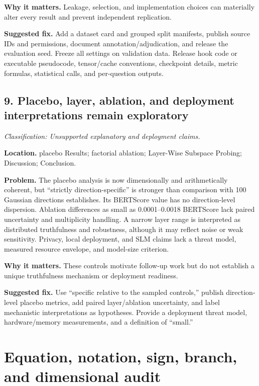 \documentclass[11pt]{article}
\newcommand{\findinglabel}[1]{\textbf{#1}}
\newcommand{\classification}[1]{\textit{Classification: #1.}}
\begin{document}
\findinglabel{Why it matters.} Leakage, selection, and implementation choices can materially alter every result and prevent independent replication.

\findinglabel{Suggested fix.} Add a dataset card and grouped split manifests, publish source IDs and permissions, document annotation/adjudication, and release the evaluation seed.  Freeze all settings on validation data.  Release hook code or executable pseudocode, tensor/cache conventions, checkpoint details, metric formulas, statistical calls, and per-question outputs.

\subsection*{9. Placebo, layer, ablation, and deployment interpretations remain exploratory}

\classification{Unsupported explanatory and deployment claims}

\findinglabel{Location.} placebo Results; factorial ablation; Layer-Wise Subspace Probing; Discussion; Conclusion.

\findinglabel{Problem.} The placebo analysis is now dimensionally and arithmetically coherent, but ``strictly direction-specific'' is stronger than comparison with 100 Gaussian directions establishes.  Its BERTScore value has no direction-level dispersion.  Ablation differences as small as 0.0001--0.0018 BERTScore lack paired uncertainty and multiplicity handling.  A narrow layer range is interpreted as distributed truthfulness and robustness, although it may reflect noise or weak sensitivity.  Privacy, local deployment, and SLM claims lack a threat model, measured resource envelope, and model-size criterion.

\findinglabel{Why it matters.} These controls motivate follow-up work but do not establish a unique truthfulness mechanism or deployment readiness.

\findinglabel{Suggested fix.} Use ``specific relative to the sampled controls,'' publish direction-level placebo metrics, add paired layer/ablation uncertainty, and label mechanistic interpretations as hypotheses.  Provide a deployment threat model, hardware/memory measurements, and a definition of ``small.''

\section*{Equation, notation, sign, branch, and dimensional audit}
\end{document}
